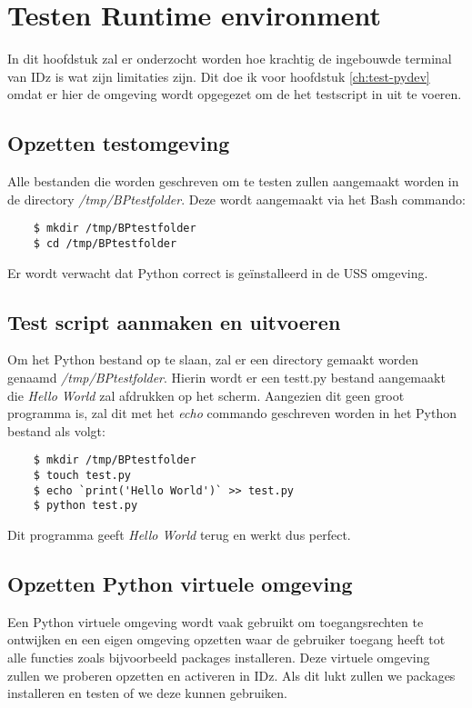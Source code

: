 \chapter{Testen Runtime environment}
\label{ch:test-runtime}
In dit hoofdstuk zal er onderzocht worden hoe krachtig de ingebouwde terminal van IDz is wat zijn limitaties zijn. Dit doe ik voor hoofdstuk \ref{ch:test-pydev} omdat er hier de omgeving wordt opgegezet om de het testscript in uit te voeren. \\


\section{Opzetten testomgeving}
Alle bestanden die worden geschreven om te testen zullen aangemaakt worden in de directory \textit{/tmp/BPtestfolder}. 
Deze wordt aangemaakt via het Bash commando: 

\begin{lstlisting}
    $ mkdir /tmp/BPtestfolder
    $ cd /tmp/BPtestfolder
\end{lstlisting}

Er wordt verwacht dat Python correct is geïnstalleerd in de USS omgeving.

\section{Test script aanmaken en uitvoeren}
Om het Python bestand op te slaan, zal er een directory gemaakt worden genaamd \textit{/tmp/BPtestfolder}. Hierin wordt er een testt.py bestand aangemaakt die \textit{Hello World} zal afdrukken op het scherm. Aangezien dit geen groot programma is, zal dit met het \textit{echo} commando geschreven worden in het Python bestand als volgt:\

\begin{lstlisting}
    $ mkdir /tmp/BPtestfolder
    $ touch test.py
    $ echo `print('Hello World')` >> test.py
    $ python test.py
\end{lstlisting}

Dit programma geeft \textit{Hello World} terug en werkt dus perfect.

\section{Opzetten Python virtuele omgeving}
Een Python virtuele omgeving wordt vaak gebruikt om toegangsrechten te ontwijken en een eigen omgeving opzetten waar de gebruiker toegang heeft tot alle functies zoals bijvoorbeeld packages installeren. Deze virtuele omgeving zullen we proberen opzetten en activeren in IDz. Als dit lukt zullen we packages installeren en testen of we deze kunnen gebruiken.

